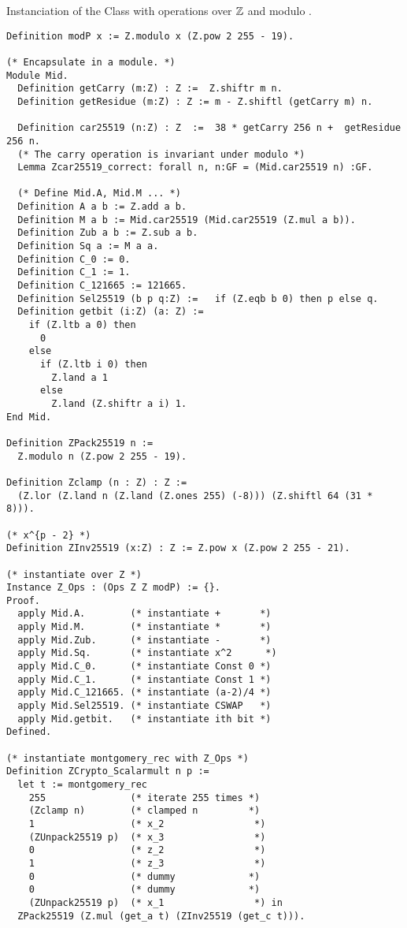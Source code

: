 \documentclass{article}
\begin{document}
\newpage


Instanciation of the Class  with operations over $\mathbb{Z}$ and modulo \p.
\begin{lstlisting}[language=Coq]
Definition modP x := Z.modulo x (Z.pow 2 255 - 19).

(* Encapsulate in a module. *)
Module Mid.
  Definition getCarry (m:Z) : Z :=  Z.shiftr m n.
  Definition getResidue (m:Z) : Z := m - Z.shiftl (getCarry m) n.

  Definition car25519 (n:Z) : Z  :=  38 * getCarry 256 n +  getResidue 256 n.
  (* The carry operation is invariant under modulo *)
  Lemma Zcar25519_correct: forall n, n:GF = (Mid.car25519 n) :GF.

  (* Define Mid.A, Mid.M ... *)
  Definition A a b := Z.add a b.
  Definition M a b := Mid.car25519 (Mid.car25519 (Z.mul a b)).
  Definition Zub a b := Z.sub a b.
  Definition Sq a := M a a.
  Definition C_0 := 0.
  Definition C_1 := 1.
  Definition C_121665 := 121665.
  Definition Sel25519 (b p q:Z) :=   if (Z.eqb b 0) then p else q.
  Definition getbit (i:Z) (a: Z) :=
    if (Z.ltb a 0) then
      0
    else
      if (Z.ltb i 0) then
        Z.land a 1
      else
        Z.land (Z.shiftr a i) 1.
End Mid.

Definition ZPack25519 n :=
  Z.modulo n (Z.pow 2 255 - 19).

Definition Zclamp (n : Z) : Z :=
  (Z.lor (Z.land n (Z.land (Z.ones 255) (-8))) (Z.shiftl 64 (31 * 8))).

(* x^{p - 2} *)
Definition ZInv25519 (x:Z) : Z := Z.pow x (Z.pow 2 255 - 21).

(* instantiate over Z *)
Instance Z_Ops : (Ops Z Z modP) := {}.
Proof.
  apply Mid.A.        (* instantiate +       *)
  apply Mid.M.        (* instantiate *       *)
  apply Mid.Zub.      (* instantiate -       *)
  apply Mid.Sq.       (* instantiate x^2      *)
  apply Mid.C_0.      (* instantiate Const 0 *)
  apply Mid.C_1.      (* instantiate Const 1 *)
  apply Mid.C_121665. (* instantiate (a-2)/4 *)
  apply Mid.Sel25519. (* instantiate CSWAP   *)
  apply Mid.getbit.   (* instantiate ith bit *)
Defined.

(* instantiate montgomery_rec with Z_Ops *)
Definition ZCrypto_Scalarmult n p :=
  let t := montgomery_rec
    255               (* iterate 255 times *)
    (Zclamp n)        (* clamped n         *)
    1                 (* x_2                *)
    (ZUnpack25519 p)  (* x_3                *)
    0                 (* z_2                *)
    1                 (* z_3                *)
    0                 (* dummy             *)
    0                 (* dummy             *)
    (ZUnpack25519 p)  (* x_1                *) in
  ZPack25519 (Z.mul (get_a t) (ZInv25519 (get_c t))).
\end{lstlisting}
\end{document}
